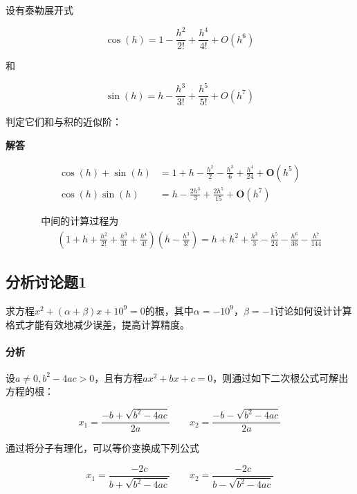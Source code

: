 设有泰勒展开式

$$\cos (h)=1-\frac{h^{2}}{2 !}+\frac{h^{4}}{4 !}+O\left(h^{6}\right)$$

和


$$\sin (h)=h-\frac{h^{3}}{3 !}+\frac{h^{5}}{5 !}+O\left(h^{7}\right)$$

判定它们和与积的近似阶：

\textbf{解答}

\begin{equation}
\begin{aligned} \cos (h)+\sin (h) &=1+h-\frac{h^{2}}{2}-\frac{h^{3}}{6}+\frac{h^{4}}{24}+\boldsymbol{O}\left(h^{5}\right) \\ \cos (h) \sin (h) &=h-\frac{2 h^{3}}{3}+\frac{2 h^{5}}{15}+\boldsymbol{O}\left(h^{7}\right) \end{aligned}
\end{equation}

\begin{equation}
\begin{array}{l}{\text { 中间的计算过程为}} \\ {\qquad\left(1+h+\frac{h^{2}}{2 !}+\frac{h^{3}}{3 !}+\frac{h^{4}}{4 !}\right)\left(h-\frac{h^{3}}{3 !}\right)=h+h^{2}+\frac{h^{3}}{3}-\frac{h^{5}}{24}-\frac{h^{6}}{36}-\frac{h^{7}}{144}}\end{array}
\end{equation}




\subsection{分析讨论题1}

求方程$x^2+(\alpha+\beta)x+10^9=0$的根，其中$\alpha=-10^9，\beta=-1$讨论如何设计计算格式才能有效地减少误差，提高计算精度。

\paragraph{分析}


设$a \neq 0, b^2 - 4ac > 0$，且有方程$ax^2 + bx + c = 0$，则通过如下二次根公式可解出方程的根：

\begin{equation}
x_1=\frac{-b+\sqrt{b^2-4ac}}{2a}  \quad \quad x_2=\frac{-b-\sqrt{b^2-4ac}}{2a}
\label{eq3}
\tag{1}
\end{equation}

通过将分子有理化，可以等价变换成下列公式

\begin{equation}
x_1=\frac{-2c}{b+\sqrt{b^2-4ac}} \quad \quad x_2=\frac{-2c}{b-\sqrt{b^2-4ac}}
\label{eq4}
\tag{2}
\end{equation}

